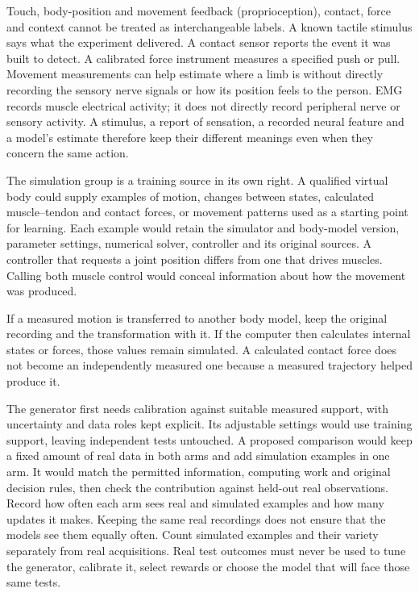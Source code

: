 Touch, body-position and movement feedback (proprioception), contact, force and context cannot be treated as interchangeable labels. A known tactile stimulus says what the experiment delivered. A contact sensor reports the event it was built to detect. A calibrated force instrument measures a specified push or pull. Movement measurements can help estimate where a limb is without directly recording the sensory nerve signals or how its position feels to the person. EMG records muscle electrical activity; it does not directly record peripheral nerve or sensory activity. A stimulus, a report of sensation, a recorded neural feature and a model's estimate therefore keep their different meanings even when they concern the same action.

The simulation group is a training source in its own right. A qualified virtual body could supply examples of motion, changes between states, calculated muscle--tendon and contact forces, or movement patterns used as a starting point for learning. Each example would retain the simulator and body-model version, parameter settings, numerical solver, controller and its original sources. A controller that requests a joint position differs from one that drives muscles. Calling both muscle control would conceal information about how the movement was produced.

If a measured motion is transferred to another body model, keep the original recording and the transformation with it. If the computer then calculates internal states or forces, those values remain simulated. A calculated contact force does not become an independently measured one because a measured trajectory helped produce it.

The generator first needs calibration against suitable measured support, with uncertainty and data roles kept explicit. Its adjustable settings would use training support, leaving independent tests untouched. A proposed comparison would keep a fixed amount of real data in both arms and add simulation examples in one arm. It would match the permitted information, computing work and original decision rules, then check the contribution against held-out real observations. Record how often each arm sees real and simulated examples and how many updates it makes. Keeping the same real recordings does not ensure that the models see them equally often. Count simulated examples and their variety separately from real acquisitions. Real test outcomes must never be used to tune the generator, calibrate it, select rewards or choose the model that will face those same tests.

